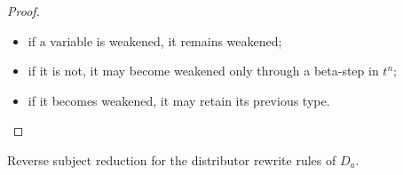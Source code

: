 \documentclass[orivec]{llncs}
\begin{document}
\begin{proof}
\begin{itemize}
	\item
if a variable is weakened, it remains weakened;

	\item
if it is not, it may become weakened only through a beta-step in $t^n$;
 
	\item
if it becomes weakened, it may retain its previous type.

\end{itemize}

\end{proof}



\newpage

\noindent
\begin{ALlemma}
Reverse subject reduction for the distributor rewrite rules of $D_a$.
\end{ALlemma}
\end{document}
